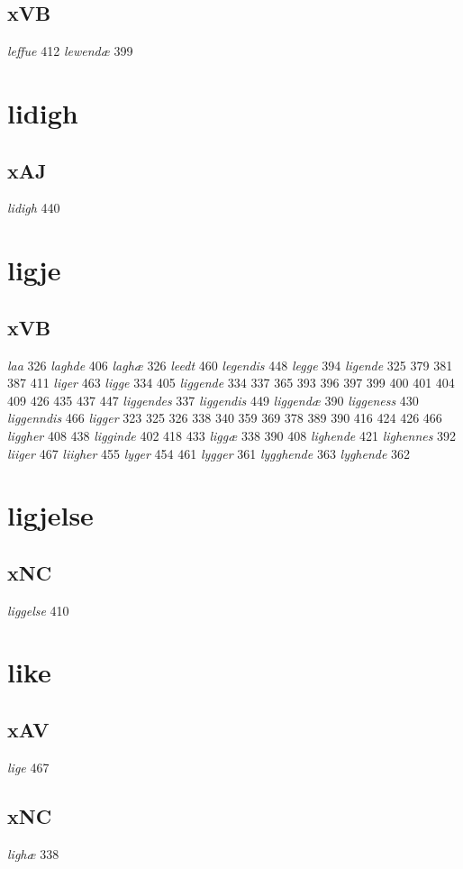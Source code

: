 \documentclass[a4paper,twocolumn]{article}
\begin{document}
\subsection{xVB}
\label{sec:org924eae5}
\emph{leffue} 412 \emph{lewendæ} 399 
\section{lidigh}
\label{sec:org3579ef4}
\subsection{xAJ}
\label{sec:org918078d}
\emph{lidigh} 440 
\section{ligje}
\label{sec:org3f84982}
\subsection{xVB}
\label{sec:org73069ef}
\emph{laa} 326 \emph{laghde} 406 \emph{laghæ} 326 \emph{leedt} 460 \emph{legendis} 448 \emph{legge} 394 \emph{ligende} 325 379 381 387 411 \emph{liger} 463 \emph{ligge} 334 405 \emph{liggende} 334 337 365 393 396 397 399 400 401 404 409 426 435 437 447 \emph{liggendes} 337 \emph{liggendis} 449 \emph{liggendæ} 390 \emph{liggeness} 430 \emph{liggenndis} 466 \emph{ligger} 323 325 326 338 340 359 369 378 389 390 416 424 426 466 \emph{liggher} 408 438 \emph{ligginde} 402 418 433 \emph{liggæ} 338 390 408 \emph{lighende} 421 \emph{lighennes} 392 \emph{liiger} 467 \emph{liigher} 455 \emph{lyger} 454 461 \emph{lygger} 361 \emph{lygghende} 363 \emph{lyghende} 362 
\section{ligjelse}
\label{sec:orgb43686c}
\subsection{xNC}
\label{sec:org9799a11}
\emph{liggelse} 410 
\section{like}
\label{sec:org27fee7a}
\subsection{xAV}
\label{sec:orgffdf811}
\emph{lige} 467 
\subsection{xNC}
\label{sec:org19a724c}
\emph{lighæ} 338 
\end{document}
